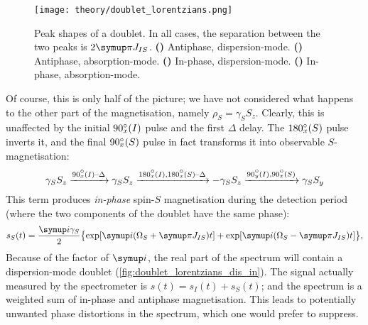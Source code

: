 \begin{figure}[htbp]
    \centering
    \texttt{[image: theory/doublet\_lorentzians.png]}%
    {\label{fig:doublet_lorentzians_dis_anti}}%
    {\label{fig:doublet_lorentzians_abs_anti}}%
    {\label{fig:doublet_lorentzians_dis_in}}%
    {\label{fig:doublet_lorentzians_abs_in}}%
    \caption[Absorption- and dispersion-mode in-phase and antiphase doublets]{
        Peak shapes of a doublet.
        In all cases, the separation between the two peaks is $2\cpi J_{IS}$.
        \textbf{()} Antiphase, dispersion-mode.
        \textbf{()} Antiphase, absorption-mode.
        \textbf{()} In-phase, dispersion-mode.
        \textbf{()} In-phase, absorption-mode.
    }
    \label{fig:doublet_lorentzians}
\end{figure}

Of course, this is only half of the picture; we have not considered what happens to the other part of the magnetisation, namely $\rho_S = \gamma_S S_z$.
Clearly, this is unaffected by the initial $\angang{90}{x}(I)$ pulse and the first $\Delta$ delay.
The $\angang{180}{x}(S)$ pulse inverts it, and the final $\angang{90}{x}(S)$ pulse in fact transforms it into observable $S$-magnetisation:
\begin{equation}
    \label{eq:inept_prodop_s}
    \gamma_S S_z \xrightarrow{\angang{90}{x}(I)\text{--}\Delta} \gamma_S S_z
    \xrightarrow{\angang{180}{x}(I),\angang{180}{x}(S)\text{--}\Delta} -\gamma_S S_z
    \xrightarrow{\angang{90}{y}(I),\angang{90}{x}(S)} \gamma_S S_y
\end{equation}
This term produces \textit{in-phase} spin-$S$ magnetisation during the detection period (where the two components of the doublet have the same phase):
\begin{equation}
    \label{eq:inept_fid_S}
    s_S(t) = \frac{\mi\gamma_S}{2}\bigl\{\exp[\mi(\Omega_S + \cpi J_{IS})t] + \exp[\mi(\Omega_S - \cpi J_{IS})t]\bigr\},
\end{equation}
Because of the factor of $\mi$, the real part of the spectrum will contain a dispersion-mode doublet (\cref{fig:doublet_lorentzians_dis_in}).
The signal actually measured by the spectrometer is $s(t) = s_I(t) + s_S(t)$; and the spectrum is a weighted sum of in-phase and antiphase magnetisation.
This leads to potentially unwanted phase distortions in the spectrum, which one would prefer to suppress.

